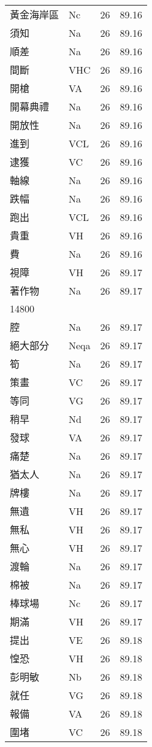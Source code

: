 \documentclass[twocolumn]{book}
\begin{document}
\begin{supertabular}{llrr}
黃金海岸區 & Nc & 26 &  89.16\\
須知 & Na & 26 &  89.16\\
順差 & Na & 26 &  89.16\\
間斷 & VHC & 26 &  89.16\\
開槍 & VA & 26 &  89.16\\
開幕典禮 & Na & 26 &  89.16\\
開放性 & Na & 26 &  89.16\\
進到 & VCL & 26 &  89.16\\
逮獲 & VC & 26 &  89.16\\
軸線 & Na & 26 &  89.16\\
跌幅 & Na & 26 &  89.16\\
跑出 & VCL & 26 &  89.16\\
貴重 & VH & 26 &  89.16\\
費 & Na & 26 &  89.16\\
視障 & VH & 26 &  89.17\\
著作物 & Na & 26 &  89.17\\
14800\\
腔 & Na & 26 &  89.17\\
絕大部分 & Neqa & 26 &  89.17\\
筍 & Na & 26 &  89.17\\
策畫 & VC & 26 &  89.17\\
等同 & VG & 26 &  89.17\\
稍早 & Nd & 26 &  89.17\\
發球 & VA & 26 &  89.17\\
痛楚 & Na & 26 &  89.17\\
猶太人 & Na & 26 &  89.17\\
牌樓 & Na & 26 &  89.17\\
無遺 & VH & 26 &  89.17\\
無私 & VH & 26 &  89.17\\
無心 & VH & 26 &  89.17\\
渡輪 & Na & 26 &  89.17\\
棉被 & Na & 26 &  89.17\\
棒球場 & Nc & 26 &  89.17\\
期滿 & VH & 26 &  89.17\\
提出 & VE & 26 &  89.18\\
惶恐 & VH & 26 &  89.18\\
彭明敏 & Nb & 26 &  89.18\\
就任 & VG & 26 &  89.18\\
報備 & VA & 26 &  89.18\\
圍堵 & VC & 26 &  89.18\\

\end{supertabular}
\end{document}
